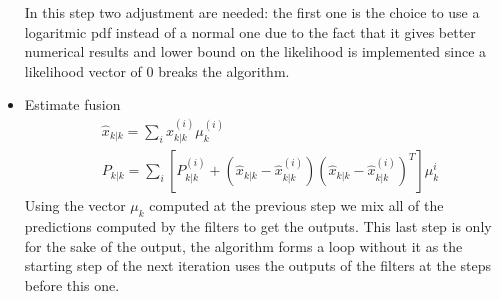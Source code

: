 \documentclass[twocolumn]{article}
\begin{document}
\begin{itemize}
           In this step two adjustment are needed: the first one is the choice to use a logaritmic pdf instead of a normal one due 
           to the fact that it gives better numerical results and lower bound on the likelihood is implemented since a likelihood 
           vector of $0$ breaks the algorithm.
    \item Estimate fusion
          \begin{align*}
               & \hat{x}_{k|k}=\sum_{i}x^{(i)}_{k|k}\mu^{(i)}_{k}                                                                      \\
               & P_{k|k}=\sum_{i}[P^{(i)}_{k|k}+(\hat{x}_{k|k}-\hat{x}^{(i)}_{k|k})(\hat{x}_{k|k}-\hat{x}^{(i)}_{k|k})^{T}]\mu_{k}^{i}
          \end{align*}
          Using the vector $\mu_{k}$ computed at the previous step we mix all of the predictions computed by the filters to get 
          the outputs. This last step is only for the sake of the output, the algorithm forms a loop without it as the starting step of 
          the next iteration uses the outputs of the filters at the steps before this one.
\end{itemize}
\end{document}

